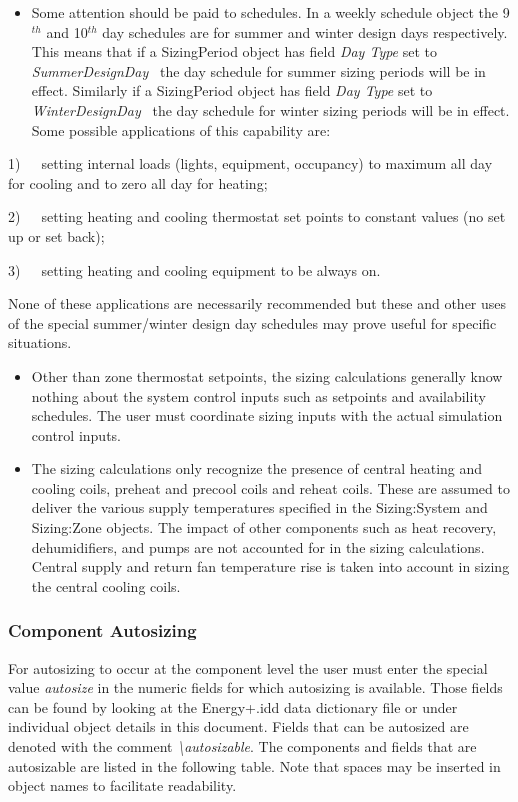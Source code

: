 \begin{itemize}
\item
  Some attention should be paid to schedules. In a weekly schedule object the 9\(^{th}\) and 10\(^{th}\) day schedules are for summer and winter design days respectively. This means that if a SizingPeriod object has field \emph{Day Type} set to \emph{SummerDesignDay} ~the day schedule for summer sizing periods will be in effect. Similarly if a SizingPeriod object has field \emph{Day Type} set to \emph{WinterDesignDay} ~the day schedule for winter sizing periods will be in effect. Some possible applications of this capability are:
\end{itemize}

1)~~~setting internal loads (lights, equipment, occupancy) to maximum all day for cooling and to zero all day for heating;

2)~~~setting heating and cooling thermostat set points to constant values (no set up or set back);

3)~~~setting heating and cooling equipment to be always on.

None of these applications are necessarily recommended but these and other uses of the special summer/winter design day schedules may prove useful for specific situations.

\begin{itemize}
\item
  Other than zone thermostat setpoints, the sizing calculations generally know nothing about the system control inputs such as setpoints and availability schedules. The user must coordinate sizing inputs with the actual simulation control inputs.
\item
  The sizing calculations only recognize the presence of central heating and cooling coils, preheat and precool coils and reheat coils. These are assumed to deliver the various supply temperatures specified in the Sizing:System and Sizing:Zone objects. The impact of other components such as heat recovery, dehumidifiers, and pumps are not accounted for in the sizing calculations. Central supply and return fan temperature rise is taken into account in sizing the central cooling coils.
\end{itemize}

\subsubsection{Component Autosizing}\label{component-autosizing}

For autosizing to occur at the component level the user must enter the special value \emph{autosize} in the numeric fields for which autosizing is available. Those fields can be found by looking at the Energy+.idd data dictionary file or under individual object details in this document. Fields that can be autosized are denoted with the comment \emph{\textbackslash{}autosizable}. The components and fields that are autosizable are listed in the following table. Note that spaces may be inserted in object names to facilitate readability.

